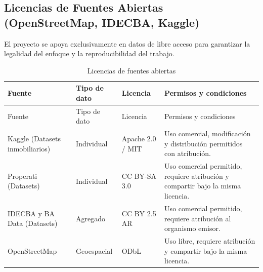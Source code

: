 \subsection{Licencias de Fuentes Abiertas (OpenStreetMap, IDECBA, Kaggle)}

El proyecto se apoya exclusivamente en datos de libre acceso para garantizar la legalidad del enfoque y la reproducibilidad del trabajo.

\begin{center}
\small
\begin{longtable}{|p{}|p{}|p{}|p{}|}
\caption{Licencias de fuentes abiertas}\label{tab:licencias}\\
\hline
Fuente & Tipo de dato & Licencia & Permisos y condiciones \\
\hline
\endfirsthead
\hline
Fuente & Tipo de dato & Licencia & Permisos y condiciones \\
\hline
\endhead
Kaggle (Datasets inmobiliarios) & Individual & Apache 2.0 / MIT & Uso comercial, modificación y distribución permitidos con atribución. \\
\hline
Properati (Datasets) & Individual & CC BY-SA 3.0 & Uso comercial permitido, requiere atribución y compartir bajo la misma licencia. \\
\hline
IDECBA y BA Data (Datasets) & Agregado & CC BY 2.5 AR & Uso comercial permitido, requiere atribución al organismo emisor. \\
\hline
OpenStreetMap & Geoespacial & ODbL & Uso libre, requiere atribución y compartir bajo la misma licencia. \\
\hline
\end{longtable}
\end{center}
